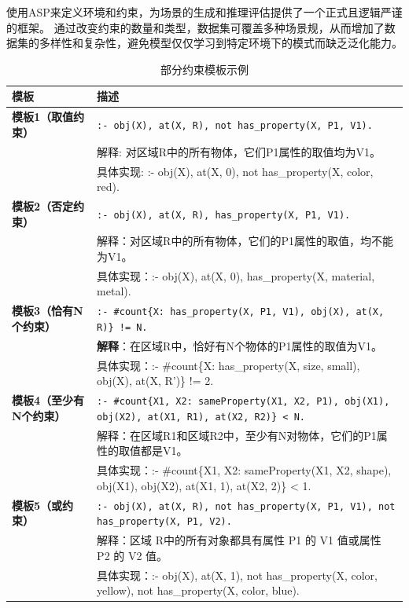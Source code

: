 使用ASP来定义环境和约束，为场景的生成和推理评估提供了一个正式且逻辑严谨的框架。
通过改变约束的数量和类型，数据集可覆盖多种场景规，从而增加了数据集的多样性和复杂性，避免模型仅仅学习到特定环境下的模式而缺乏泛化能力。
\begin{table}[h]
    \centering
    \renewcommand{\arraystretch}{1.0}
    \begin{tabular}{|p{3cm}|p{12cm}|}
        \hline
        \textbf{模板} & \textbf{描述} \\
        \hline
        \textbf{模板1（取值约束）} & 
        \texttt{:- obj(X), at(X, R), not has\_property(X, P1, V1).} \\ 
        & 解释: 对区域R中的所有物体，它们P1属性的取值均为V1。 \\ 
        & 具体实现: :- obj(X), at(X, 0), not has\_property(X, color, red). \\
        \hline
        
        \textbf{模板2（否定约束）} & 
        \texttt{:- obj(X), at(X, R), has\_property(X, P1, V1).} \\ 
        & 解释：对区域R中的所有物体，它们的P1属性的取值，均不能为V1。 \\ 
        & 具体实现：:- obj(X), at(X, 0), has\_property(X, material, metal). \\
        \hline
        
        \textbf{模板3（恰有N个约束）} & 
        \texttt{:- \#count\{X: has\_property(X, P1, V1), obj(X), at(X, R)\} != N.} \\ 
        & \textbf{解释}：在区域R中，恰好有N个物体的P1属性的取值为V1。 \\ 
        & 具体实现：:- \#count\{X: has\_property(X, size, small), obj(X), at(X, R')\} != 2. \\
        \hline
        
        \textbf{模板4（至少有N个约束）} & 
        \texttt{:- \#count\{X1, X2: sameProperty(X1, X2, P1), obj(X1), obj(X2), at(X1, R1), at(X2, R2)\} < N.} \\ 
        & 解释：在区域R1和区域R2中，至少有N对物体，它们的P1属性的取值都是V1。 \\ 
        & 具体实现：:- \#count\{X1, X2: sameProperty(X1, X2, shape), obj(X1), obj(X2), at(X1, 1), at(X2, 2)\} < 1. \\
        \hline
        
        \textbf{模板5（或约束）} & 
        \texttt{:- obj(X), at(X, R), not has\_property(X, P1, V1), not has\_property(X, P1, V2).} \\ 
        & 解释：区域 R中的所有对象都具有属性 P1 的 V1 值或属性 P2 的 V2 值。 \\ 
        & 具体实现：:- obj(X), at(X, 1), not has\_property(X, color, yellow), not has\_property(X, color, blue). \\
        \hline
    \end{tabular}
    \caption{部分约束模板示例}
    \label{tab:asp_templates}
\end{table}
